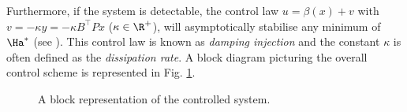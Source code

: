 %
Furthermore, if the system is detectable, the control law $u = \beta(x)+v$ with $v = - \kappa y = - \kappa B^\top Px$ ($\kappa\in\R^+$), will asymptotically stabilise any minimum of $\Ha^*$ (see \citealp{secchi2007control}). 
This control law is known as \textit{damping injection} and the constant $\kappa$ is often defined as the \textit{dissipation rate}.
A block diagram  picturing the overall control scheme is represented in Fig. \ref{fig:block}.
%
\begin{figure}[!t]
	\centering
	
	\vspace{-2mm}
	\caption{\footnotesize A block representation of the controlled system.}
	\label{fig:block}
\end{figure}
%
%
%
%
